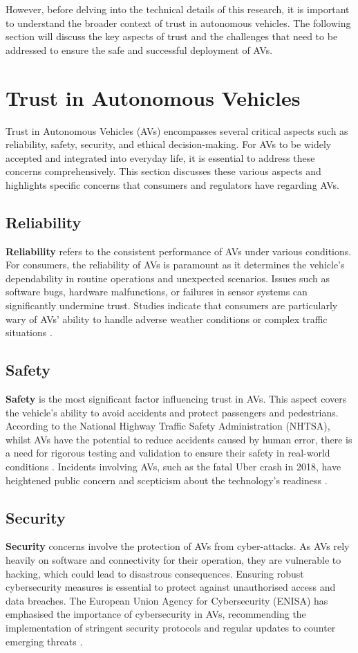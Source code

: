 However, before delving into the technical details of this research, it is important to understand the broader context of trust in autonomous vehicles. The following section will discuss the key aspects of trust and the challenges that need to be addressed to ensure the safe and successful deployment of AVs.

\section{Trust in Autonomous Vehicles}

Trust in Autonomous Vehicles (AVs) encompasses several critical aspects such as reliability, safety, security, and ethical decision-making. For AVs to be widely accepted and integrated into everyday life, it is essential to address these concerns comprehensively. This section discusses these various aspects and highlights specific concerns that consumers and regulators have regarding AVs.

\subsection{Reliability}
\textbf{Reliability} refers to the consistent performance of AVs under various conditions. For consumers, the reliability of AVs is paramount as it determines the vehicle's dependability in routine operations and unexpected scenarios. Issues such as software bugs, hardware malfunctions, or failures in sensor systems can significantly undermine trust. Studies indicate that consumers are particularly wary of AVs' ability to handle adverse weather conditions or complex traffic situations \cite{gogoll2017}.

\subsection{Safety}
\textbf{Safety} is the most significant factor influencing trust in AVs. This aspect covers the vehicle's ability to avoid accidents and protect passengers and pedestrians. According to the National Highway Traffic Safety Administration (NHTSA), whilst AVs have the potential to reduce accidents caused by human error, there is a need for rigorous testing and validation to ensure their safety in real-world conditions \cite{nhtsa2020}. Incidents involving AVs, such as the fatal Uber crash in 2018, have heightened public concern and scepticism about the technology's readiness \cite{goodall2016}.

\subsection{Security}
\textbf{Security} concerns involve the protection of AVs from cyber-attacks. As AVs rely heavily on software and connectivity for their operation, they are vulnerable to hacking, which could lead to disastrous consequences. Ensuring robust cybersecurity measures is essential to protect against unauthorised access and data breaches. The European Union Agency for Cybersecurity (ENISA) has emphasised the importance of cybersecurity in AVs, recommending the implementation of stringent security protocols and regular updates to counter emerging threats \cite{enisa2020}.

